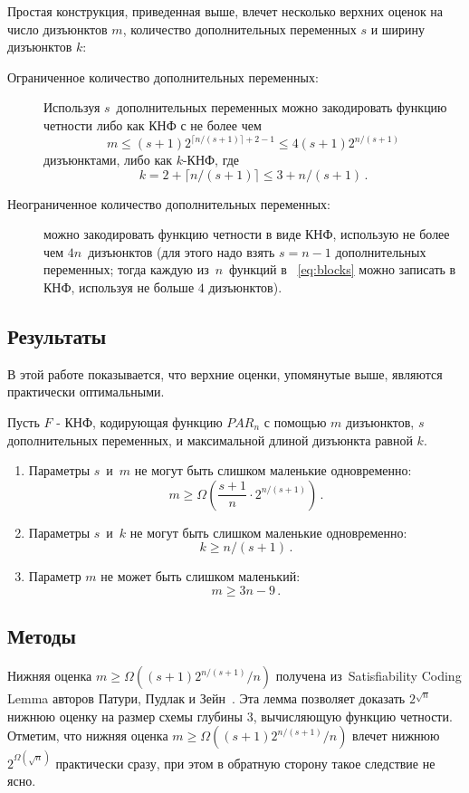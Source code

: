 Простая конструкция, приведенная выше, влечет несколько верхних оценок 
на число дизъюнктов $m$, количество дополнительных переменных $s$ и ширину дизъюнктов $k$:
\begin{description}
	\item[Ограниченное количество дополнительных переменных:]
	Используя $s$~дополнительных переменных можно закодировать функцию четности либо как 
	КНФ с не более чем \[m \le (s+1)2^{\lceil n/(s+1) \rceil+2-1} \le 4(s+1)2^{n/(s+1)}\] дизъюнктами, либо как $k$-КНФ, где  \[k=2+{\lceil n/(s+1) \rceil} \le 3+n/(s+1) \, .\]
	\item[Неограниченное количество дополнительных переменных:] можно закодировать функцию четности в виде КНФ, использую не более чем $4n$~дизъюнктов (для этого надо взять $s=n-1$ дополнительных переменных; тогда каждую из~$n$~функций в ~\eqref{eq:blocks} можно записать в КНФ, используя не больше $4$ дизъюнктов).
\end{description}
\subsection{Результаты}
В этой работе показывается, что верхние оценки, упомянутые выше, являются практически оптимальными. 
\begin{theorem}\label{thm:main}
	Пусть $F$ - КНФ, кодирующая функцию $PAR_n$ с помощью $m$ дизъюнктов, 
	$s$ дополнительных переменных, и максимальной длиной дизъюнкта равной $k$.
	\begin{enumerate}
		\item Параметры $s$~и~$m$ не могут быть слишком маленькие одновременно:
		\begin{equation}\label{eq:sm}
			m \ge \Omega\left(\frac{s+1}{n} \cdot 2^{n/(s+1)}\right) \, .
		\end{equation}
		\item Параметры $s$~и~$k$ не могут быть слишком маленькие одновременно:
		\begin{equation}\label{eq:sw}
			k \ge n/(s+1) \, .
		\end{equation}
		\item Параметр $m$ не может быть слишком маленький:
		\begin{equation}\label{eq:m}
			m \ge 3n-9 \, .
		\end{equation}
	\end{enumerate}
\end{theorem}

\subsection{Методы}
Нижняя оценка $m \ge \Omega((s+1)2^{n/(s+1)}/n)$ получена 
из~Satisfiability Coding Lemma авторов Патури, Пудлак и Зейн~\cite{DBLP:journals/cjtcs/PaturiPZ99}. 
Эта лемма позволяет доказать $2^{\sqrt{n}}$ нижнюю оценку на размер схемы глубины $3$, вычисляющую функцию четности. 
Отметим, что нижняя оценка $m \ge \Omega((s+1)2^{n/(s+1)}/n)$ влечет нижнюю $2^{\Omega(\sqrt n)}$ практически сразу,
при этом в обратную сторону такое следствие не ясно.


